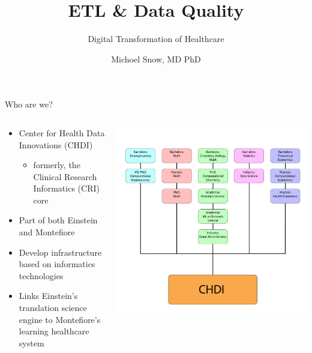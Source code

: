 \documentclass[10pt, xcolor=table]{beamer}
\title{ETL \& Data Quality}
\subtitle{Digital Transformation of Healthcare}
\date{}
\author{Michoel Snow, MD PhD}
\institute{Center for Health Data Innovations}
\begin{document}
\maketitle


\begin{frame}{Who are we?}
	\begin{columns}
		\begin{column}{0.5\textwidth}
			\begin{itemize}
				\item Center for Health Data Innovations (CHDI) 
				\begin{itemize}
					\item formerly, the Clinical Research Informatics (CRI) core
				\end{itemize}
				\item Part of both Einstein and Montefiore 
				\item Develop infrastructure based on informatics technologies
				\item Links Einstein's translation science engine to Montefiore's learning healthcare system
			\end{itemize}	
		\end{column}
		\begin{column}{0.5\textwidth}
			\includegraphics[width=1\columnwidth]{images/data_science_progression.pdf}	
		\end{column}
	\end{columns}
\end{frame}
\end{document}
